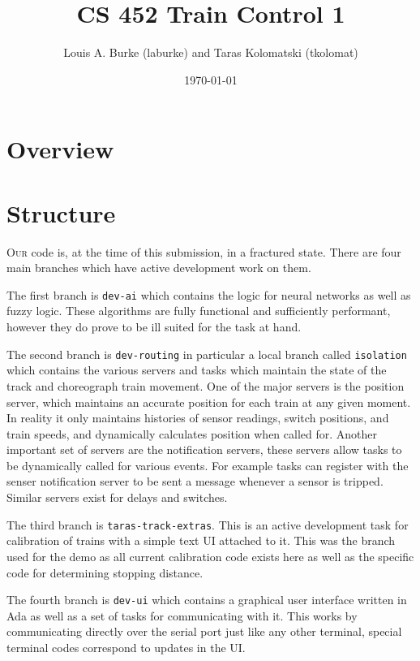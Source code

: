 \documentclass{article}
\title{\vspace{-3.5em}CS 452 Train Control 1}
\author{Louis A. Burke (laburke) and Taras Kolomatski (tkolomat)}
\date{\vspace{-0.9em}\today}
\begin{document}
\begingroup
\let\newpage\relax%
\maketitle
\endgroup

\section*{Overview}


\section*{Structure}

\textsc{Our} code is, at the time of this submission, in a fractured state.
There are four main branches which have active development work on them.

The first branch is \texttt{dev-ai} which contains the logic for neural networks
as well as fuzzy logic. These algorithms are fully functional and sufficiently
performant, however they do prove to be ill suited for the task at hand.

The second branch is \texttt{dev-routing} in particular a local branch called
\texttt{isolation} which contains the various servers and tasks which maintain
the state of the track and choreograph train movement. One of the major servers
is the position server, which maintains an accurate position for each train at
any given moment. In reality it only maintains histories of sensor readings,
switch positions, and train speeds, and dynamically calculates position when
called for. Another important set of servers are the notification servers, these
servers allow tasks to be dynamically called for various events. For example
tasks can register with the senser notification server to be sent a message
whenever a sensor is tripped. Similar servers exist for delays and switches.

The third branch is \texttt{taras-track-extras}. This is an active development
task for calibration of trains with a simple text UI attached to it. This was
the branch used for the demo as all current calibration code exists here as well
as the specific code for determining stopping distance.

The fourth branch is \texttt{dev-ui} which contains a graphical user interface
written in Ada as well as a set of tasks for communicating with it. This works
by communicating directly over the serial port just like any other terminal,
special terminal codes correspond to updates in the UI.
\end{document}
